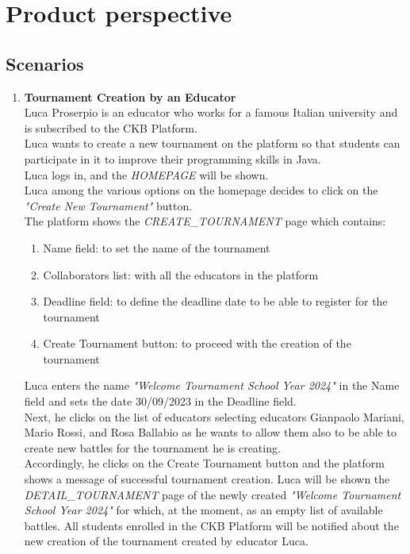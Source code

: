 \section{Product perspective}
\subsection{Scenarios}

\begin{enumerate}
	\item \textbf{Tournament Creation by an Educator}\\
	      Luca Proserpio is an educator who works for a famous Italian university and is subscribed to the CKB Platform.\\
	      Luca wants to create a new tournament on the platform so that students can participate in it to improve their programming skills in Java.\\
	      Luca logs in, and the \emph{HOMEPAGE} will be shown.\\
	      Luca among the various options on the homepage decides to click on the \emph{"Create New Tournament"} button. \\
	      The platform shows the \emph{CREATE\_TOURNAMENT} page which contains:

	      \begin{enumerate}
		      \item Name field: to set the name of the tournament
		      \item Collaborators list: with all the educators in the platform
		      \item Deadline field: to define the deadline date to be able to register for the tournament
		      \item Create Tournament button: to proceed with the creation of the tournament
	      \end{enumerate}

	      Luca enters the name \emph{"Welcome Tournament School Year 2024"} in the Name field and sets the date 30/09/2023 in the Deadline field.\\
	      Next, he clicks on the list of educators selecting educators Gianpaolo Mariani, Mario Rossi, and Rosa Ballabio as he wants to allow them also to be able to create new
	      battles for the tournament he is creating.\\
	      Accordingly, he clicks on the Create Tournament button and the platform shows a message of successful tournament creation.
	      Luca will be shown the \emph{DETAIL\_TOURNAMENT} page of the newly created \emph{"Welcome Tournament School Year 2024"} for which, at the moment, as an empty list of
	      available
	      battles.
	      All students enrolled in the CKB Platform will be notified about the new creation of the tournament created by educator Luca.





\end{enumerate}
